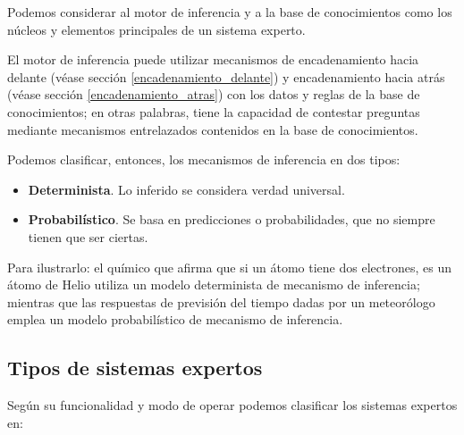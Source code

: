 \documentclass[a4paper, 11pt, titlepage]{article}
\begin{document}
        Podemos considerar al motor de inferencia y a la base de conocimientos como los núcleos 
        y elementos principales de un sistema experto.

        El motor de inferencia puede utilizar mecanismos de encadenamiento hacia delante (véase sección 
        \ref{encadenamiento_delante}) y encadenamiento hacia atrás (véase sección \ref{encadenamiento_atras})
        con los datos y reglas de la base de conocimientos; en otras palabras, tiene la capacidad de 
        contestar preguntas mediante mecanismos entrelazados contenidos en la base de conocimientos.

        Podemos clasificar, entonces, los mecanismos de inferencia en dos tipos:

        \begin{itemize}
            \item \textbf{Determinista}. Lo inferido se considera verdad universal.
            \item \textbf{Probabilístico}. Se basa en predicciones o probabilidades, que no 
            siempre tienen que ser ciertas.
        \end{itemize}

        Para ilustrarlo: el químico que afirma que si un átomo tiene dos electrones, es un 
        átomo de Helio utiliza un modelo determinista de mecanismo de inferencia; mientras que 
        las respuestas de previsión del tiempo dadas por un meteorólogo emplea un modelo probabilístico 
        de mecanismo de inferencia.

    \subsection{Tipos de sistemas expertos}

        Según su funcionalidad y modo de operar podemos clasificar los sistemas expertos en:
\end{document}
